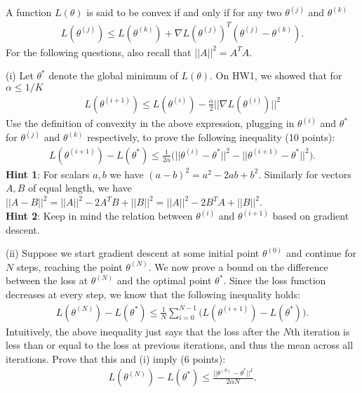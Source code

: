 \documentclass[letterpaper, 11pt]{article}
\newcommand{\problemAnswer}[1]{%
	\noindent\framebox[0.95\columnwidth][c]{\begin{minipage}{0.92\columnwidth}\color{blue}{#1}\end{minipage}} %
}
\begin{document}
A function $L(\theta)$ is said to be convex if and only if for any two $\theta^{(j)}$ and $\theta^{(k)}$
\begin{align*}
	L(\theta^{(j)}) \leq L(\theta^{(k)}) + \nabla L(\theta^{(j)})^T (\theta^{(j)} - \theta^{(k)}).
\end{align*}
For the following questions, also recall that $||A||^2 = A^TA$.

(i) Let $\theta^*$ denote the global minimum of $L(\theta)$. On HW1, we showed that for $\alpha \leq 1/K$
\begin{align*}
	L(\theta^{(i+1)}) \leq L(\theta^{(i)}) - \frac{\alpha}{2} || \nabla L(\theta^{(i)}) ||^2
\end{align*}
Use the definition of convexity in the above expression, plugging in $\theta^{(i)}$ and $\theta^*$ for  $\theta^{(j)}$ and $\theta^{(k)}$ respectively, to prove the following inequality (10 points):
\begin{align*}
	L(\theta^{(i+1)}) - L(\theta^*) \leq \frac{1}{2\alpha} \big( ||\theta^{(i)} - \theta^*||^2 - || \theta^{(i+1)} - \theta^*||^2 \big).
\end{align*}
\textbf{Hint 1}: For scalars $a, b$ we have $(a-b)^2 = a^2 - 2ab + b^2$. Similarly for vectors $A, B$ of equal length, we have $|| A-B||^2= ||A||^2 - 2A^T B  + ||B||^2=||A||^2 - 2B^T A  + ||B||^2$. \\
\textbf{Hint 2}: Keep in mind the relation between $\theta^{(i)}$ and $\theta^{(i+1)}$ based on gradient descent.


\problemAnswer{
	Write your answer here.
	\vspace*{150pt} %
}


(ii) Suppose we start gradient descent at some initial point $\theta^{(0)}$ and continue for $N$ steps, reaching the point $\theta^{(N)}$. We now prove a bound on the difference between the loss at $\theta^{(N)}$ and the optimal point $\theta^*$. Since the loss function decreases at every step, we know that the following inequality holds:
\begin{align*}
	L(\theta^{(N)}) - L(\theta^*) \leq \frac{1}{N} \sum_{i=0}^{N-1} \big( L(\theta^{(i+1)}) - L(\theta^*)  \big).
\end{align*}
Intuitively, the above inequality just says that the loss after the $N$th iteration is less than or equal to the loss at previous iterations, and thus the mean across all iterations. Prove that this and (i) imply (6 points):
\begin{align*}
	L(\theta^{(N)}) - L(\theta^*) \leq \frac{||\theta^{(0)} - \theta^*||^2}{2\alpha N}.
\end{align*}
\end{document}

